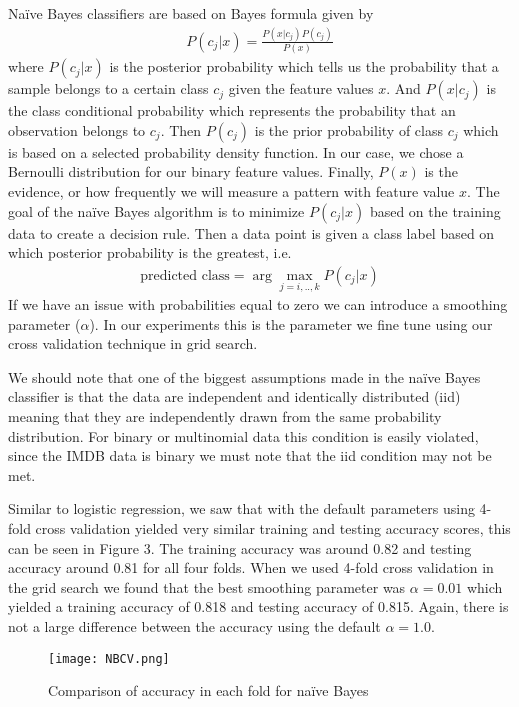 \documentclass[12pt,letterpaper]{article}
\begin{document}
Na\"ive Bayes classifiers are based on Bayes formula given by
\begin{align*}
	P(c_j|x)=\frac{P(x|c_j)P(c_j)}{P(x)}
\end{align*}
 where  $P(c_j|x)$ is the posterior probability which tells us the probability that a sample belongs to a certain class $c_j$ given the feature values $x$. And $P(x|c_j)$ is the class conditional probability which represents the probability that an observation belongs to $c_j$. Then $ P(c_j) $ is the prior probability of class $c_j$ which is based on a selected probability density function. In our case, we chose a Bernoulli distribution for our binary feature values. Finally, $P(x)$ is the evidence, or how frequently we will measure a pattern with feature value $x$. The goal of the na\"ive Bayes algorithm is to minimize $P(c_j|x)$ based on the training data to create a decision rule. Then a data point is given a class label based on which posterior probability is the greatest, i.e.
 \begin{align*}
 	\text{predicted class}=\arg\max\limits_{j=i,.., k}P(c_j|x)
\end{align*}
If we have an issue with probabilities equal to zero we can introduce a smoothing parameter ($\alpha$). In our experiments this is the parameter we fine tune using our cross validation technique in grid search. 

We should note that one of the biggest assumptions made in the na\"ive Bayes classifier is that the data are independent and identically distributed (iid) meaning that they are independently drawn from the same probability distribution. For binary or multinomial data this condition is easily violated, since the IMDB data is binary we must note that the iid condition may not be met.

Similar to logistic regression, we saw that with the default parameters using 4-fold cross validation yielded very similar training and testing accuracy scores, this can be seen in Figure 3. The training accuracy was around 0.82 and testing accuracy around 0.81 for all four folds. When we used 4-fold cross validation in the grid search we found that the best smoothing parameter was $\alpha = 0.01$ which yielded a training accuracy of 0.818 and testing accuracy of 0.815. Again, there is not a large difference between the accuracy using the default $\alpha = 1.0$.

\begin{figure}[h]
	\centering
	\texttt{[image: NBCV.png]}
	\caption{Comparison of accuracy in each fold for na\"ive Bayes}
\end{figure}
\end{document}
